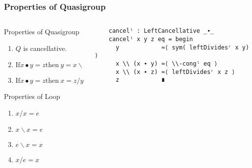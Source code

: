 \documentclass[xcolor={dvipsnames}]{beamer}
\begin{document}
  \begin{frame}[fragile]
    \frametitle{Properties of Quasigroup}  
    \begin{columns}
      \begin{column}{0.4\textwidth}
            Properties of Quasigroup
            \begin{enumerate}
            \item $Q$ is cancellative.
            \item \(\text{If}  x ∙ y = z \text{then}\ y = x \backslash z\)
            \item \(\text{If}  x ∙ y = z \text{then}\ x = z / y\)
            \end{enumerate}
        Properties of Loop
        \begin{enumerate}
        \item \(x/x=e\) 
        \item \(x\backslash x=e\)
        \item \(e\backslash x=x\) 
        \item \(x/e=x\) 
        \end{enumerate}
      \end{column}
      \hfill
      \begin{column}{0.575\textwidth}
  \begin{verbatim}
    cancelˡ : LeftCancellative _∙_
    cancelˡ x y z eq = begin
      y            ≈⟨ sym( leftDividesʳ x y) ⟩
      x \\ (x ∙ y) ≈⟨ \\-congˡ eq ⟩
      x \\ (x ∙ z) ≈⟨ leftDividesʳ x z ⟩
      z            ∎
  \end{verbatim}
      \end{column}
    \end{columns}
  \end{frame}
\end{document}

